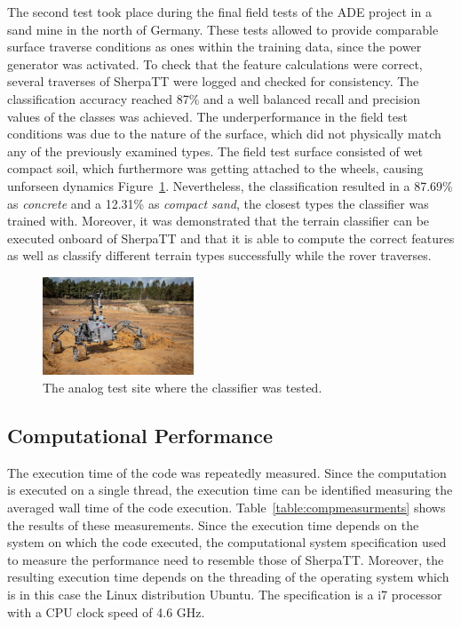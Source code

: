 \documentclass{article}
\begin{document}
The second test took place during the final field tests of the ADE project \cite{ocon2021} in a sand mine in the north of Germany.
These tests allowed to provide comparable surface traverse conditions as ones within the training data, since the power generator was activated.
To check that the feature calculations were correct, several traverses of SherpaTT were logged and checked for consistency. 
The classification accuracy reached 87\% and a well balanced recall and precision values of the classes was achieved. 
The underperformance in the field test conditions was due to the nature of the surface, which did not physically match any of the previously examined types. 
The field test surface consisted of wet compact soil, which furthermore was getting attached to the wheels, causing unforseen dynamics Figure~\ref{fig:finaltest}.
Nevertheless, the classification resulted in a 87.69\% as \emph{concrete} and a 12.31\% as \emph{compact sand}, the closest types the classifier was trained with.
Moreover, it was demonstrated that the terrain classifier can be executed onboard of SherpaTT and that it is able to compute the correct features as well as classify different terrain types successfully while the rover traverses.

\begin{figure}[!htb]
    \centering
        \includegraphics[width=0.4\textwidth]{../figures/sandmine_v2.jpg}
    \caption{The analog test site where the classifier was tested.}
    \label{fig:finaltest}
\end{figure}


\subsection{Computational Performance}

The execution time of the code was repeatedly measured. Since the computation is executed on a single thread, the execution time can be identified measuring the averaged wall time of the code execution. Table~\ref{table:compmeasurments} shows the results of these measurements. Since the execution time depends on the system on which the code executed, the computational system specification used to measure the performance need to resemble those of SherpaTT. Moreover, the resulting execution time depends
on the threading of the operating system which is in this case the Linux distribution Ubuntu. The specification is a i7 processor with a CPU clock speed of 4.6 GHz. 
\end{document}
